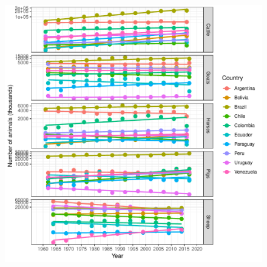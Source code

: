 \documentclass[a4paper,10pt]{article}
\begin{document}
\newpage
\begin{center}
\begin{figure}[H]
\begin{center}
\includegraphics[scale=.80]{FIGURES/PLOTS/production.pdf}
\end{center}
\caption{}
\label{sfig:prod}
\end{figure}
\end{center}
\newpage
\end{document}
